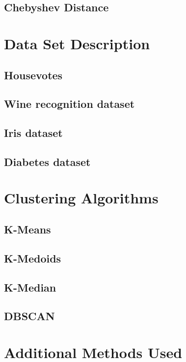\documentclass[12pt, english]
{article}
\begin{document}
\subsection{Chebyshev Distance}


\section{Data Set Description}

\subsection{Housevotes} \label{housevotes}

\subsection{Wine recognition dataset}

\subsection{Iris dataset}

\subsection{Diabetes dataset} \label{diabetes}


\section{Clustering Algorithms}
\subsection{K-Means}

\subsection{K-Medoids}

\subsection{K-Median}

\subsection{DBSCAN}


\section{Additional Methods Used}
\end{document}
